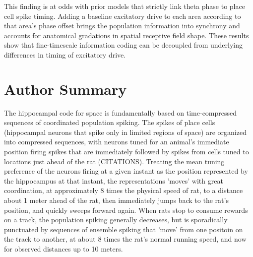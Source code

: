 \documentclass[10pt]{article}
\begin{document}
This finding is at odds with prior models that strictly link theta phase to place cell spike timing. Adding a baseline excitatory drive to each area according to that area's phase offset brings the population information into synchrony and accounts for anatomical gradations in spatial receptive field shape.  These results show that fine-timescale information coding can be decoupled from underlying differences in timing of excitatory drive.

\section*{Author Summary}
The hippocampal code for space is fundamentally based on time-compressed sequences of coordinated population spiking. The spikes of place cells (hippocampal neurons that spike only in limited regions of space) are organized into compressed sequences, with neurons tuned for an animal's immediate position firing spikes that are immediately followed by spikes from cells tuned to locations just ahead of the rat (CITATIONS). Treating the mean tuning preference of the neurons firing at a given instant as the position represented by the hippocampus at that instant, the representations 'moves' with great coordination, at approximately 8 times the physical speed of rat, to a distance about 1 meter ahead of the rat, then immediately jumps back to the rat's position, and quickly sweeps forward again. When rats stop to consume rewards on a track, the population spiking generally decreases, but is sporadically punctuated by sequences of ensemble spiking that 'move' from one positoin on the track to another, at about 8 times the rat's normal running speed, and now for observed distances up to 10 meters. 
\end{document}
